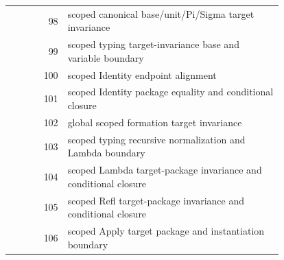 \documentclass[11pt]{article}
\theoremstyle{definition}
\begin{document}
\begin{center}
\begin{tabular}{@{}r p{0.79\linewidth}@{}}
98 & scoped canonical base/unit/Pi/Sigma target invariance \\
99 & scoped typing target-invariance base and variable boundary \\
100 & scoped Identity endpoint alignment \\
101 & scoped Identity package equality and conditional closure \\
102 & global scoped formation target invariance \\
103 & scoped typing recursive normalization and Lambda boundary \\
104 & scoped Lambda target-package invariance and conditional closure \\
105 & scoped Refl target-package invariance and conditional closure \\
106 & scoped Apply target package and instantiation boundary \\
\bottomrule
\end{tabular}
\end{center}
\end{document}
